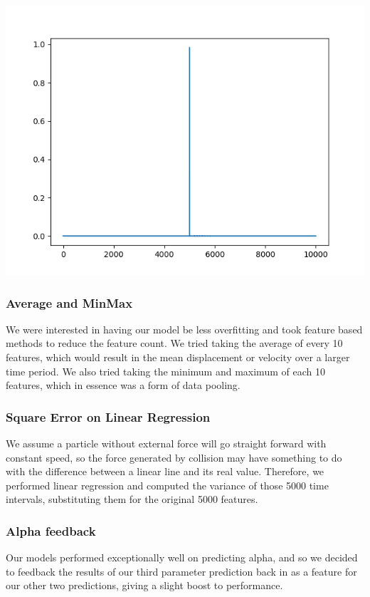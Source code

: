 \documentclass[a4paper, 12pt]{article}
\newenvironment{Figure}
  {\par\medskip\noindent\minipage{\linewidth}}
  {\endminipage\par\medskip}
\begin{document}
\begin{multicols}{2}
\begin{Figure}
                    \centering
                    \includegraphics[width=\linewidth]{images/importance_3.png}
                    \label{penfeat}
                \end{Figure}

                \subsubsection{Average and MinMax}
                    We were interested in having our model be less overfitting and took feature based methods to reduce the feature count. We tried taking the average of every 10 features, which would result in the mean displacement or velocity over a larger time period. We also tried taking the minimum and maximum of each 10 features, which in essence was a form of data pooling.

                \subsubsection{Square Error on Linear Regression}
                    We assume a particle without external force will go straight forward with constant speed, so the force generated by collision may have something to do with the difference between a linear line and its real value. Therefore, we performed linear regression and computed the variance of those 5000 time intervals, substituting them for the original 5000 features.

                \subsubsection{Alpha feedback}
                    Our models performed exceptionally well on predicting alpha, and so we decided to feedback the results of our third parameter prediction back in as a feature for our other two predictions, giving a slight boost to performance.


\end{multicols}
\end{document}
